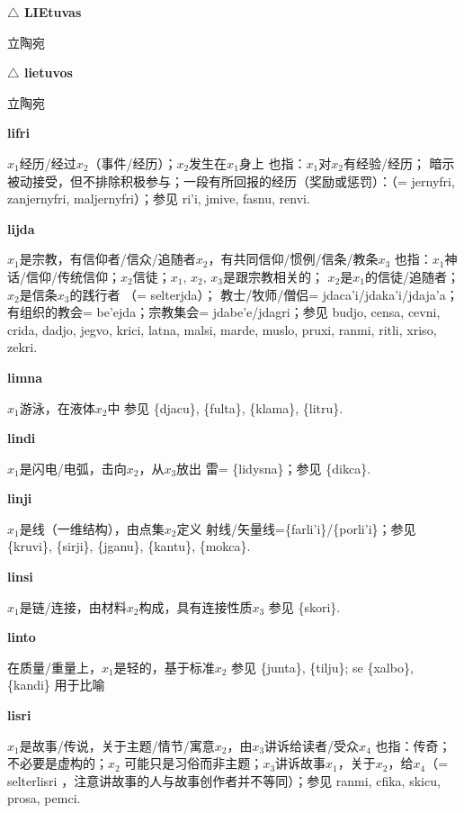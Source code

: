 \documentclass[notitlepage,twocolumn,a4paper,10pt]{book}
\begin{document}
{\sffamily\bfseries $\triangle$ LIEtuvas} 立陶宛

{\sffamily\bfseries $\triangle$ lietuvos} 立陶宛

{\sffamily\bfseries lifri}  $x_1$经历\slash{}经过$x_2$（事件\slash{}经历）；$x_2$发生在$x_1$身上 \textemdash{} 也指：$x_1$对$x_2$有经验\slash{}经历； 暗示被动接受，但不排除积极参与；一段有所回报的经历（奖励或惩罚）：（= {jernyfri}, {zanjernyfri}, {maljernyfri}）；参见 {ri'i}, {jmive}, {fasnu}, {renvi}.

{\sffamily\bfseries lijda}\enspace {\ttfamily\bfseries[    jda]}  $x_1$是宗教，有信仰者\slash{}信众\slash{}追随者$x_2$，有共同信仰\slash{}惯例\slash{}信条\slash{}教条$x_3$ \textemdash{} 也指：$x_1$神话\slash{}信仰\slash{}传统信仰；$x_2$信徒；$x_1$, $x_2$, $x_3$是跟宗教相关的； $x_2$是$x_1$的信徒\slash{}追随者； $x_2$是信条$x_3$的践行者 （= selterjda）； 教士\slash{}牧师\slash{}僧侣= {jdaca'i}\slash{}{jdaka'i}\slash{}{jdaja'a}；有组织的教会= {be'ejda}；宗教集会= {jdabe'e}\slash{}{jdagri}；参见 {budjo}, {censa}, {cevni}, {crida}, {dadjo}, {jegvo}, {krici}, {latna}, {malsi}, {marde}, {muslo}, {pruxi}, {ranmi}, {ritli}, {xriso}, {zekri}.

{\sffamily\bfseries limna}\enspace {\ttfamily\bfseries[lim]}  $x_1$游泳，在液体$x_2$中 \textemdash{} 参见 \{djacu\}, \{fulta\}, \{klama\}, \{litru\}.

{\sffamily\bfseries lindi}\enspace {\ttfamily\bfseries[lid]}  $x_1$是闪电\slash{}电弧，击向$x_2$，从$x_3$放出 \textemdash{} 雷= \{lidysna\}；参见 \{dikca\}.

{\sffamily\bfseries linji}\enspace {\ttfamily\bfseries[lij     li'i]}  $x_1$是线（一维结构），由点集$x_2$定义 \textemdash{} 射线\slash{}矢量线=\{farli'i\}\slash{}\{porli'i\}；参见 \{kruvi\}, \{sirji\}, \{jganu\}, \{kantu\}, \{mokca\}.

{\sffamily\bfseries linsi}\enspace {\ttfamily\bfseries[lin]}  $x_1$是链\slash{}连接，由材料$x_2$构成，具有连接性质$x_3$ \textemdash{} 参见 \{skori\}.

{\sffamily\bfseries linto}\enspace {\ttfamily\bfseries[        li'o]}  在质量\slash{}重量上，$x_1$是轻的，基于标准$x_2$ \textemdash{} 参见 \{junta\}, \{tilju\}; se \{xalbo\}, \{kandi\} 用于比喻

{\sffamily\bfseries lisri}\enspace {\ttfamily\bfseries[lis]}  $x_1$是故事\slash{}传说，关于主题\slash{}情节\slash{}寓意$x_2$，由$x_3$讲诉给读者\slash{}受众$x_4$ \textemdash{} 也指：传奇； 不必要是虚构的；$x_2$ 可能只是习俗而非主题；$x_3$讲诉故事$x_1$，关于$x_2$，给$x_4$（= {selterlisri} ，注意讲故事的人与故事创作者并不等同）；参见 {ranmi}, {cfika}, {skicu}, {prosa}, {pemci}.
\end{document}
